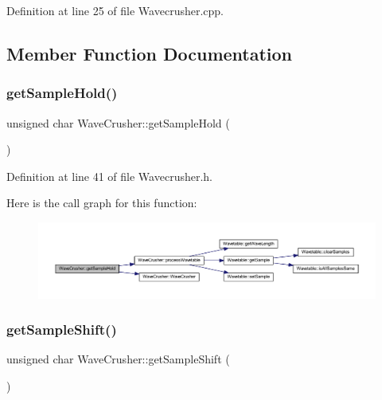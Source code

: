 Definition at line 25 of file Wavecrusher.\+cpp.



\subsection{Member Function Documentation}
\mbox{\label{class_wave_crusher_a084b8413b14c16e4cab7f65caf9e3fd0}} 
\subsubsection{\texorpdfstring{get\+Sample\+Hold()}{getSampleHold()}}
{\footnotesize\ttfamily unsigned char Wave\+Crusher\+::get\+Sample\+Hold (\begin{DoxyParamCaption}{ }\end{DoxyParamCaption})\hspace{0.3cm}{\ttfamily [inline]}}



Definition at line 41 of file Wavecrusher.\+h.

Here is the call graph for this function\+:
\nopagebreak
\begin{figure}[H]
\begin{center}
\leavevmode
\includegraphics[width=350pt]{df/d70/class_wave_crusher_a084b8413b14c16e4cab7f65caf9e3fd0_cgraph}
\end{center}
\end{figure}
\mbox{\label{class_wave_crusher_a08b705c5bb1c1c4a22d8265f2992a0bd}} 
\subsubsection{\texorpdfstring{get\+Sample\+Shift()}{getSampleShift()}}
{\footnotesize\ttfamily unsigned char Wave\+Crusher\+::get\+Sample\+Shift (\begin{DoxyParamCaption}{ }\end{DoxyParamCaption})\hspace{0.3cm}{\ttfamily [inline]}}



